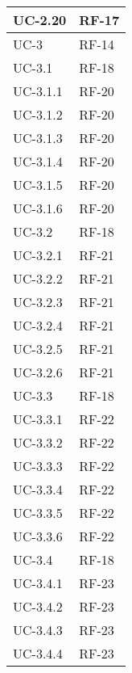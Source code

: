\begin{longtable}{|>{\centering\arraybackslash}m{}|>{\centering\arraybackslash}m{}|}
	UC-2.20             & RF-17                   \\\hline
	UC-3                & RF-14                   \\\hline
	UC-3.1              & RF-18                   \\\hline
	UC-3.1.1            & RF-20                   \\\hline
	UC-3.1.2            & RF-20                   \\\hline
	UC-3.1.3            & RF-20                   \\\hline
	UC-3.1.4            & RF-20                   \\\hline
	UC-3.1.5            & RF-20                   \\\hline
	UC-3.1.6            & RF-20                   \\\hline
	UC-3.2              & RF-18                   \\\hline
	UC-3.2.1            & RF-21                   \\\hline
	UC-3.2.2            & RF-21                   \\\hline
	UC-3.2.3            & RF-21                   \\\hline
	UC-3.2.4            & RF-21                   \\\hline
	UC-3.2.5            & RF-21                   \\\hline
	UC-3.2.6            & RF-21                   \\\hline
	UC-3.3              & RF-18                   \\\hline
	UC-3.3.1            & RF-22                   \\\hline
	UC-3.3.2            & RF-22                   \\\hline
	UC-3.3.3            & RF-22                   \\\hline
	UC-3.3.4            & RF-22                   \\\hline
	UC-3.3.5            & RF-22                   \\\hline
	UC-3.3.6            & RF-22                   \\\hline
	UC-3.4              & RF-18                   \\\hline
	UC-3.4.1            & RF-23                   \\\hline
	UC-3.4.2            & RF-23                   \\\hline
	UC-3.4.3            & RF-23                   \\\hline
	UC-3.4.4            & RF-23                   \\\hline

\end{longtable}
